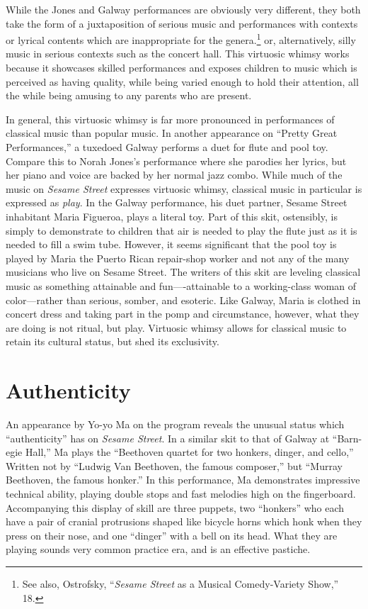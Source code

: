 \documentclass[12pt,letterpaper]{article}
\begin{document}
        While the Jones and Galway performances are obviously very different, 
	they both take the form of a juxtaposition of serious music and 
	performances with contexts or lyrical contents which are inappropriate 
	for the genera.\footnote{See also, Ostrofsky,  ``\textit{Sesame Street}
	as a Musical Comedy-Variety Show,'' 18.} or, alternatively, silly music
	in serious contexts such as the concert hall. This virtuosic whimsy 
	works because it showcases skilled performances and exposes children to
	music which is perceived as having quality, while being varied enough 
	to hold their attention, all the while being amusing to any parents who 
	are present.

	In general, this virtuosic whimsy is far more pronounced in performances
	of classical music than popular music. In another appearance on ``Pretty
	Great Performances,'' a tuxedoed Galway performs a duet for flute and 
	pool toy.\autocite{Galway1} Compare this to Norah Jones's performance 
	where she parodies her lyrics, but her piano and voice are backed by her
	normal jazz combo. While much of the music on \textit{Sesame Street} 
	expresses virtuosic whimsy, classical music in particular is expressed 
	as \textit{play}. In the Galway performance, his duet partner, Sesame 
	Street inhabitant Maria Figueroa,\autocite{Maria} plays a literal toy. 
	Part of this skit, ostensibly, is simply to demonstrate to children that
	air is needed to play the flute just as it is needed to fill a swim 
	tube. However, it seems significant that the pool toy is played by Maria
	the Puerto Rican repair-shop worker and not any of the many musicians 
	who live on Sesame Street. The writers of this skit are leveling 
	classical music as something attainable and fun----attainable to a 
	working-class woman of color---rather than serious, somber, and 
	esoteric. Like Galway, Maria is clothed in concert dress and taking part
	in the pomp and circumstance, however, what they are doing is not 
	ritual, but play. Virtuosic whimsy allows for classical music to retain 
	its cultural status, but shed its exclusivity.

	\section*{Authenticity}

	An appearance by Yo-yo Ma on the program reveals the unusual status 
	which ``authenticity'' has on \textit{Sesame Street}. In a similar 
	skit to that of Galway at ``Barn-egie Hall,'' Ma plays the 
	``Beethoven quartet for two honkers, dinger, and cello,'' Written not 
	by ``Ludwig Van Beethoven, the famous composer,'' but ``Murray 
	Beethoven, the famous honker.''\autocite{MaHonkers} In this performance,
	Ma demonstrates impressive technical ability, playing double stops and 
	fast melodies high on the fingerboard. Accompanying this display of 
	skill are three puppets, two ``honkers'' who each have a pair of cranial
	protrusions shaped like bicycle horns which honk when they press on 
	their nose, and one ``dinger'' with a bell on its head. What they are 
	playing sounds very common practice era, and is an effective pastiche.
\end{document}

